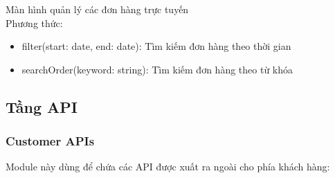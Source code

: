 Màn hình quản lý các đơn hàng trực tuyến\\
Phương thức:
\begin{itemize}
    \item filter(start: date, end: date): Tìm kiếm đơn hàng theo thời gian
    \item searchOrder(keyword: string): Tìm kiếm đơn hàng theo từ khóa
\end{itemize}



\subsection{Tầng API}
\subsubsection{Customer APIs}
Module này dùng để chứa các API được xuất ra ngoài cho phía khách hàng:

